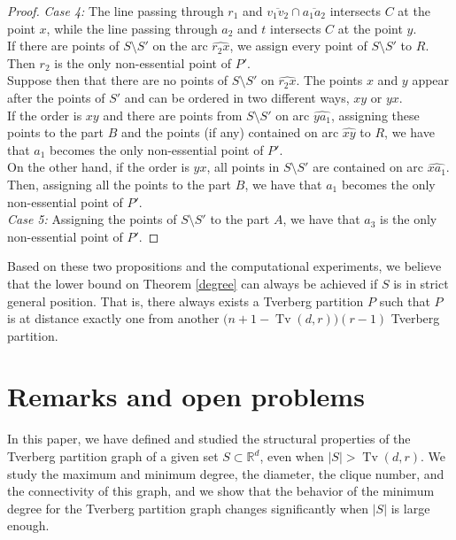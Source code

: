 \documentclass[11pt,a4paper]{article}
\theoremstyle{plain}
\theoremstyle{definition}
\newcommand{\rr}{\mathds{R}}
\newcommand{\tv}{\operatorname{Tv}}
\begin{document}
\begin{proof}
\noindent\emph{Case 4:} 
The line passing through $r_1$ and $\overline{v_1v_2}\cap \overline{a_1a_2}$ intersects $C$ at the point $x$, while the line passing through $a_2$ and $t$ intersects $C$ at the point $y$.\\
If there are points of $S\setminus S'$ on the arc $\widehat{r_2x}$, we assign every point of $S\setminus S'$ to $R$. Then $r_2$ is the only non-essential point of $P'$.\\
Suppose then that there are no points of $S\setminus S'$ on $\widehat{r_2x}$. The points $x$ and $y$ appear after the points of $S'$ and can be ordered in two different ways, $xy$ or $yx$.\\
If the order is $xy$ and there are points from $S\setminus S'$ on arc $\widehat{ya_1}$, assigning these points to the part $B$ and the points (if any) contained on arc $\widehat{xy}$ to $R$, we have that $a_1$ becomes the only non-essential point of $P'$.\\
On the other hand, if the order is $yx$, all points in $S\setminus S'$ are contained on arc $\widehat{xa_1}$. Then, assigning all the points to the part $B$, we have that $a_1$ becomes the only non-essential point of $P'$.\\



\noindent\emph{Case 5:} 
Assigning the points of $S\setminus S'$  to the part $A$, we have that $a_3$ is the only non-essential point of $P'$.
\end{proof}









Based on these two propositions and the computational experiments, we believe that the lower bound on Theorem \ref{degree} can always be achieved if $S$ is in strict general position. That is, there always exists a Tverberg partition $P$ such that $P$ is at distance exactly one from another  $\Big(n+1 - \tv(d,r) \Big)(r-1)$ Tverberg partition.





\section{Remarks and open problems}\label{sec:remarks}


In this paper, we have defined and studied the structural properties of the Tverberg partition graph of a given set $S \subset \rr^d$, even when $|S| > \tv(d,r)$.   We study the maximum and minimum degree, the diameter, the clique number, and the connectivity of this graph, and we show that the behavior of the minimum degree for the Tverberg partition graph changes significantly when $|S|$ is large enough. 
\end{document}
